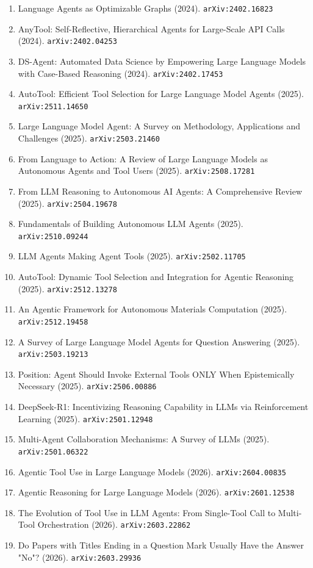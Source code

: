 \documentclass[11pt]{article}
\begin{document}
\begin{enumerate}
  \item Language Agents as Optimizable Graphs (2024). \texttt{arXiv:2402.16823}
  \item AnyTool: Self-Reflective, Hierarchical Agents for Large-Scale API Calls (2024). \texttt{arXiv:2402.04253}
  \item DS-Agent: Automated Data Science by Empowering Large Language Models
  with Case-Based Reasoning (2024). \texttt{arXiv:2402.17453}
  \item AutoTool: Efficient Tool Selection for Large Language Model Agents (2025). \texttt{arXiv:2511.14650}
  \item Large Language Model Agent: A Survey on Methodology, Applications and
  Challenges (2025). \texttt{arXiv:2503.21460}
  \item From Language to Action: A Review of Large Language Models as Autonomous Agents and Tool Users (2025). \texttt{arXiv:2508.17281}
  \item From LLM Reasoning to Autonomous AI Agents: A Comprehensive Review (2025). \texttt{arXiv:2504.19678}
  \item Fundamentals of Building Autonomous LLM Agents (2025). \texttt{arXiv:2510.09244}
  \item LLM Agents Making Agent Tools (2025). \texttt{arXiv:2502.11705}
  \item AutoTool: Dynamic Tool Selection and Integration for Agentic Reasoning (2025). \texttt{arXiv:2512.13278}
  \item An Agentic Framework for Autonomous Materials Computation (2025). \texttt{arXiv:2512.19458}
  \item A Survey of Large Language Model Agents for Question Answering (2025). \texttt{arXiv:2503.19213}
  \item Position: Agent Should Invoke External Tools ONLY When Epistemically Necessary (2025). \texttt{arXiv:2506.00886}
  \item DeepSeek-R1: Incentivizing Reasoning Capability in LLMs via Reinforcement Learning (2025). \texttt{arXiv:2501.12948}
  \item Multi-Agent Collaboration Mechanisms: A Survey of LLMs (2025). \texttt{arXiv:2501.06322}
  \item Agentic Tool Use in Large Language Models (2026). \texttt{arXiv:2604.00835}
  \item Agentic Reasoning for Large Language Models (2026). \texttt{arXiv:2601.12538}
  \item The Evolution of Tool Use in LLM Agents: From Single-Tool Call to Multi-Tool Orchestration (2026). \texttt{arXiv:2603.22862}
  \item Do Papers with Titles Ending in a Question Mark Usually Have the Answer "No"? (2026). \texttt{arXiv:2603.29936}
\end{enumerate}
\end{document}
